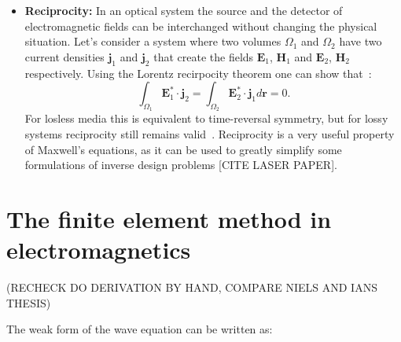 \begin{itemize}
    \item \textbf{Reciprocity:} In an optical system the source and the detector of electromagnetic fields can be interchanged without changing the physical situation. Let's consider a system where two volumes $\Omega_1$ and $\Omega_2$ 
    have two current densities $\mathbf{j}_1$ and $\mathbf{j}_2$ that create the fields $\mathbf{E}_1$, $\mathbf{H}_1$ and $\mathbf{E}_2$, $\mathbf{H}_2$ respectively. Using the Lorentz recirpocity theorem one can show that~\cite{novotny}:      
    \begin{equation}
        \int_{\Omega_1} \mathbf{E}_1^* \cdot \mathbf{j}_2 = \int_{\Omega_2}  \mathbf{E}_2^* \cdot \mathbf{j}_1 d\mathbf{r} = 0.
    \end{equation}
    For losless media this is equivalent to time-reversal symmetry, but for lossy systems reciprocity still remains valid~\cite{Carminati:98}. Reciprocity is a very useful property of Maxwell's equations, as it can be used to 
    greatly simplify some formulations of inverse design problems [CITE LASER PAPER].


\end{itemize}



\section{The finite element method in electromagnetics}

(RECHECK DO DERIVATION BY HAND, COMPARE NIELS AND IANS THESIS)

The weak form of the wave equation can be written as:

